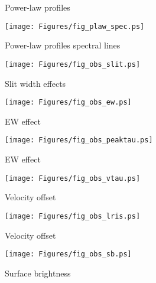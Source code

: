 \documentclass[12pt,preprint]{aastex}
\begin{document}
\begin{figure}
\caption{
Power-law profiles
}
\label{fig:plaws}
\end{figure}

\begin{figure}
\texttt{[image: Figures/fig\_plaw\_spec.ps]}
\caption{
Power-law profiles spectral lines
}
\label{fig:plaws_spec}
\end{figure}


\begin{figure}
\texttt{[image: Figures/fig\_obs\_slit.ps]}
\caption{
Slit width effects
}
\label{fig:obs_slit}
\end{figure}

\begin{figure}
\texttt{[image: Figures/fig\_obs\_ew.ps]}
\caption{
EW effect
}
\label{fig:obs_ew}
\end{figure}

\begin{figure}
\texttt{[image: Figures/fig\_obs\_peaktau.ps]}
\caption{
EW effect
}
\label{fig:obs_peaktau}
\end{figure}

\begin{figure}
\texttt{[image: Figures/fig\_obs\_vtau.ps]}
\caption{
Velocity offset
}
\label{fig:obs_vtau}
\end{figure}

\begin{figure}
\texttt{[image: Figures/fig\_obs\_lris.ps]}
\caption{
Velocity offset
}
\label{fig:obs_lris}
\end{figure}

\begin{figure}
\texttt{[image: Figures/fig\_obs\_sb.ps]}
\caption{
Surface brightness
}
\label{fig:obs_sb}
\end{figure}
\end{document}
